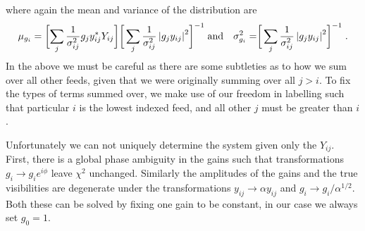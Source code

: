 \documentclass{revtex4}
\begin{document}
where again the mean and variance of the distribution are
\begin{equation}
\mu_{g_i} = \biggl[ \sum_j \frac{1}{\sigma_{ij}^2} g_j y_{ij}^* Y_{ij} \biggr] \biggr[ \sum_{j} \frac{1}{\sigma_{ij}^2} \left\lvert g_j y_{ij} \right\rvert^2 \biggr]^{-1}
\; \text{and} \quad
\sigma_{g_i}^2 = \biggr[ \sum_{j} \frac{1}{\sigma_{ij}^2} \left\lvert g_j y_{ij} \right\rvert^2 \biggr]^{-1} \; .
\end{equation}
In the above we must be careful as there are some subtleties as to how we sum
over all other feeds, given that we were originally summing over all $j > i$.
To fix the types of terms summed over, we make use of our freedom in labelling
such that particular $i$ is the lowest indexed feed, and all other $j$ must be
greater than $i$.

Unfortunately we can not uniquely determine the system given only the
$Y_{ij}$. First, there is a global phase ambiguity in the gains such that
transformations $g_i \rightarrow g_i e^{i \phi}$ leave $\chi^2$ unchanged.
Similarly the amplitudes of the gains and the true visibilities are degenerate
under the transformations $y_{ij} \rightarrow \alpha y_{ij}$ and $g_i
\rightarrow g_i / \alpha^{1/2}$. Both these can be solved by fixing one gain
to be constant, in our case we always set $g_0 = 1$.
\end{document}
